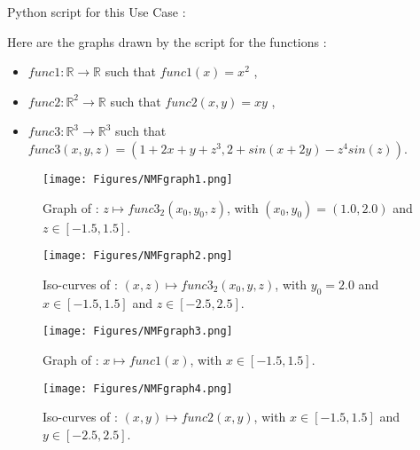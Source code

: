              Python script for this Use Case :


             Here are the graphs drawn by the script for the functions :
             \begin{itemize}
             \item $func1 : \mathbb{R} \rightarrow \mathbb{R}$ such that $func1(x)  = x^2$ ,
             \item $func2 : \mathbb{R}^2 \rightarrow \mathbb{R}$ such that $func2(x,y)  = xy$ ,
             \item $func3 : \mathbb{R}^3 \rightarrow \mathbb{R}^3$ such that $func3(x,y,z)  =(1+2x+y+z^3, 2+sin(x+2y)-z^4sin(z))$.
             \end{itemize}


             \begin{figure}[H]
               \begin{minipage}{8cm}
                 \begin{center}
                   \texttt{[image: Figures/NMFgraph1.png]}
                   \caption{Graph of : $ z \mapsto  func3_2(x_0,y_0,z)$, with $(x_0,y_0) = (1.0, 2.0)$ and $z\in [-1.5, 1.5]$.}
                   \label{graph1}
                 \end{center}
               \end{minipage}
               \hfill
               \begin{minipage}{8cm}
                 \begin{center}
                   \texttt{[image: Figures/NMFgraph2.png]}
                   \caption{Iso-curves of : $ (x,z) \mapsto  func3_2(x_0,y,z)$, with $y_0 = 2.0$ and $x\in [-1.5, 1.5]$ and $z\in [-2.5, 2.5]$.}
                   \label{graph2}
                 \end{center}
               \end{minipage}
             \end{figure}


             \begin{figure}[H]
               \begin{minipage}{8cm}
                 \begin{center}
                   \texttt{[image: Figures/NMFgraph3.png]}
                   \caption{Graph of : $ x \mapsto  func1(x)$, with $x\in [-1.5, 1.5]$.}
                   \label{graph1}
                 \end{center}
               \end{minipage}
               \hfill
               \begin{minipage}{8cm}
                 \begin{center}
                   \texttt{[image: Figures/NMFgraph4.png]}
                   \caption{Iso-curves of : $ (x,y) \mapsto  func2(x,y)$, with  $x\in [-1.5, 1.5]$ and $y\in [-2.5, 2.5]$.}
                   \label{graph2}
                 \end{center}
               \end{minipage}
             \end{figure}
